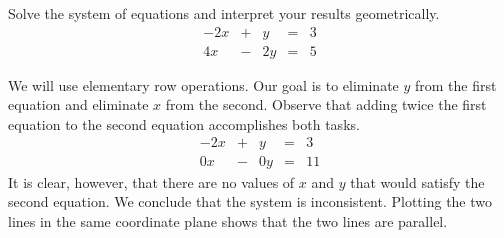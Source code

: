 \documentclass{ximera}
\begin{document}
\begin{example}\label{ex:systwoeqs2} Solve the system of equations and interpret your results geometrically.
$$\begin{array}{ccccc}
      -2x & +&y&= &3 \\
	 4x& -&2y&=&5
    \end{array}$$
\begin{explanation}
We will use elementary row operations.  Our goal is to eliminate $y$ from the first equation and eliminate $x$ from the second.  Observe that adding twice the first equation to the second equation accomplishes both tasks.
$$\begin{array}{ccccc}
      -2x & +&y&= &3 \\
	 0x& -&0y&=&11
    \end{array}$$
It is clear, however, that there are no values of $x$ and $y$ that would satisfy the second equation.  We conclude that the system is inconsistent.  Plotting the two lines in the same coordinate plane shows that the two lines are parallel.  
    \begin{image}[2in]
\end{image}
\end{explanation}
\end{example}
\end{document}
